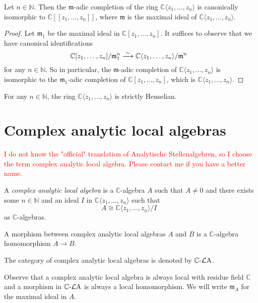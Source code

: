 \begin{proposition}\label{prop-completionconvergenseries}
    Let $n\in \mathbb{N}$. Then the $\mathfrak{m}$-adic completion of the ring  $\mathbb{C}\langle z_1,\ldots,z_n \rangle$ is canonically isomorphic to $\mathbb{C}[[ z_1,\ldots,z_n ]]$, where $\mathfrak{m}$ is the maximal ideal of $\mathbb{C}\langle z_1,\ldots,z_n \rangle$. 
\end{proposition}
\begin{proof}
    Let $\mathfrak{m}_1$ be the maximal ideal in $\mathbb{C}[z_1,\ldots,z_n]$. It suffices to observe that we have canonical identifications
    \[
        \mathbb{C}[z_1,\ldots,z_n]/\mathfrak{m}_1^n\stackrel{\sim}{\longrightarrow} \mathbb{C}\langle z_1,\ldots,z_n\rangle/\mathfrak{m}^n
    \]
    for any $n\in \mathbb{N}$. So in particular, the $\mathfrak{m}$-adic completion of $\mathbb{C}\langle z_1,\ldots,z_n \rangle$ is isomorphic to the $\mathfrak{m}_1$-adic completion of $\mathbb{C}[z_1,\ldots,z_n]$, which is $\mathbb{C}\langle z_1,\ldots,z_n \rangle$.
\end{proof}

\begin{theorem}
    For any $n\in \mathbb{N}$, the ring $\mathbb{C}\langle z_1,\ldots,z_n \rangle$ is strictly Henselian.
\end{theorem}

\section{Complex analytic local algebras}
\textcolor{red}{I do not know the "official" translation of Analytische Stellenalgebren, so I choose the term complex analytic local algebra. Please contact me if you have a better name.}

\begin{definition}
    A \emph{complex analytic local algebra} is a $\mathbb{C}$-algebra $A$ such that $A\neq 0$ and there exists some $n\in \mathbb{N}$ and an ideal $I$ in $\mathbb{C}\langle z_1,\ldots,z_n \rangle$ such that 
    \[
        A\cong \mathbb{C}\langle z_1,\ldots,z_n \rangle/I
    \]
    as $\mathbb{C}$-algebras.

    A morphism between complex analytic local algebras $A$ and $B$ is a $\mathbb{C}$-algebra homomorphism $A\rightarrow B$.

    The category of complex analytic local algebras is denoted by $\mathbb{C}\text{-}\mathcal{L}\mathrm{A}$.
\end{definition}
Observe that a complex analytic local algebra is always local with residue field $\mathbb{C}$ and a morphism in $\mathbb{C}\text{-}\mathcal{L}\mathrm{A}$ is always a local homomorphism. We will write $\mathfrak{m}_A$ for the maximal ideal in $A$.

